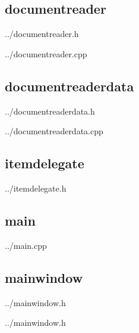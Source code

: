  \subsection{documentreader}
 
	{../documentreader.h}
 
	{../documentreader.cpp}


 \subsection{documentreaderdata}
 
	{../documentreaderdata.h}
 
	{../documentreaderdata.cpp}


 \subsection{itemdelegate}
 
	{../itemdelegate.h}


 \subsection{main}
 
	{../main.cpp}


 \subsection{mainwindow}
 
	{../mainwindow.h}
 
	{../mainwindow.h}


